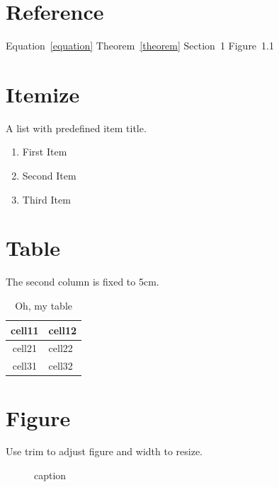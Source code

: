 \documentclass[a4paper]{article}
\begin{document}
\section{Reference}
Equation~\eqref{equation}
Theorem~\ref{theorem}
Section~1
Figure~1.1

\section{Itemize}
A list with predefined item title.
\begin{enumerate}[$(1)$]
\item First Item
\item Second Item
\item Third Item
\end{enumerate}

\section{Table}
The second column is fixed to 5cm.
\begin{table}[!ht]
\renewcommand\arraystretch{1.4} %
\begin{center}
\caption{Oh, my table}
\label{table}
\begin{tabular}{|c|p{5cm}|}
\hline
cell11 & cell12 \\
\hline
cell21 & cell22 \\
\hline
cell31 & cell32 \\
\hline
\end{tabular}
\end{center}
\end{table}

\section{Figure}
Use trim to adjust figure and width to resize.
\begin{figure}[!ht]
  \centering
  \caption{caption}\label{fig:something}
\end{figure}
\end{document}
